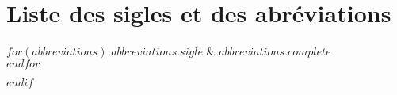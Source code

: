 \documentclass[11pt,twoside,maitrise]{littfra}
\numberwithin{equation}{section}
\numberwithin{table}{chapter}
\numberwithin{figure}{chapter}
\begin{document}
\chapter*{Liste des sigles et des abréviations}
\begin{twocolumnlist}{.2\textwidth}{.7\textwidth}
  $for(abbreviations)$
  $abbreviations.sigle$ & $abbreviations.complete$\\
  $endfor$
\end{twocolumnlist}
$endif$



\NoChapterPageNumber
\cleardoublepage


%
%  

\end{document}

